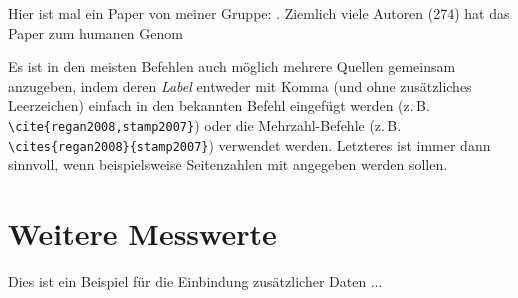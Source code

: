 Hier ist mal ein Paper von meiner Gruppe: \cite{Wappler_2024}. Ziemlich viele Autoren (274) hat das Paper zum humanen Genom \citep{Venter_2001}

Es ist in den meisten Befehlen auch möglich mehrere Quellen gemeinsam anzugeben, indem deren \textit{Label} entweder mit Komma (und ohne zusätzliches Leerzeichen) einfach in den bekannten Befehl eingefügt werden (z.\,B. \verb|\cite{regan2008,stamp2007}|) oder die Mehrzahl-Befehle (z.\,B. \verb|\cites{regan2008}{stamp2007}|) verwendet werden. Letzteres ist immer dann sinnvoll, wenn beispielsweise Seitenzahlen mit angegeben werden sollen.

\appendix
	
\chapter{Weitere Messwerte}
Dies ist ein Beispiel für die Einbindung zusätzlicher Daten ...
